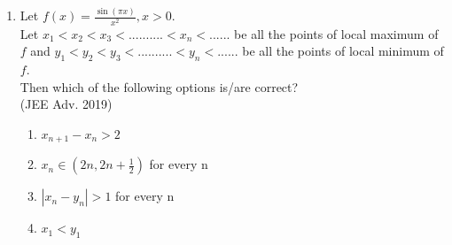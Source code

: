 \documentclass[journal,12pt,twocolumn]{IEEEtran}
\theoremstyle{remark}
\begin{document}
\begin{enumerate}
{        }
    \item{
        
            Let $f(x) = \frac{\sin(\pi x)}{x^2}, x>0$.\\[3pt]
            Let $x_1 < x_2 < x_3 < .......... <x_n <......$ be all the points of local maximum of $f$ and $y_1 < y_2 < y_3 < .......... <y_n <......$ be all the points of local minimum of $f$.\\
            Then which of the following options is/are correct?
            \\ \text{   } \hfill
                {(JEE Adv. 2019)}
            
            \begin{enumerate}
                \item $x_{n+1} - x_{n} > 2$ 
                \item $x_{n} \in (2n, 2n+\frac{1}{2})$ for every n
                \item $|x_{n} - y_{n}|> 1 $ for every n
                \item $x_{1} < y_{1}$
            \end{enumerate}
        
        }
    \end{enumerate}
\end{document}
